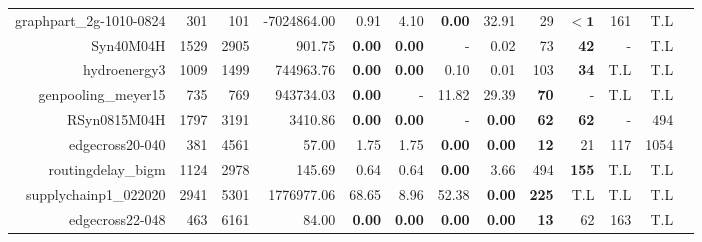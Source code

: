 \begin{landscape}
\begin{table*}[t]
\begin{tabular}{|r|r|r||r||r|r|r|r||r|r|r|r|r|}
             graphpart\_2g-1010-0824 &           301 &           101 &                       -7024864.00 &           0.91 &           4.10 &  \textbf{0.00} &          32.91 &                 29 &         $\bm{< 1}$ &                161 &                T.L \\ 
                           Syn40M04H &          1529 &          2905 &                            901.75 &  \textbf{0.00} &  \textbf{0.00} &              - &           0.02 &                 73 &        \textbf{42} &                  - &                T.L \\ 
                        hydroenergy3 &          1009 &          1499 &                         744963.76 &  \textbf{0.00} &  \textbf{0.00} &           0.10 &           0.01 &                103 &        \textbf{34} &                T.L &                T.L \\ 
                 genpooling\_meyer15 &           735 &           769 &                         943734.03 &  \textbf{0.00} &              - &          11.82 &          29.39 &        \textbf{70} &                  - &                T.L &                T.L \\ 
                        RSyn0815M04H &          1797 &          3191 &                           3410.86 &  \textbf{0.00} &  \textbf{0.00} &              - &  \textbf{0.00} &        \textbf{62} &        \textbf{62} &                  - &                494 \\ 
                     edgecross20-040 &           381 &          4561 &                             57.00 &           1.75 &           1.75 &  \textbf{0.00} &  \textbf{0.00} &        \textbf{12} &                 21 &                117 &               1054 \\ 
                  routingdelay\_bigm &          1124 &          2978 &                            145.69 &           0.64 &           0.64 &  \textbf{0.00} &           3.66 &                494 &       \textbf{155} &                T.L &                T.L \\ 
               supplychainp1\_022020 &          2941 &          5301 &                        1776977.06 &          68.65 &           8.96 &          52.38 &  \textbf{0.00} &       \textbf{225} &                T.L &                T.L &                T.L \\ 
                     edgecross22-048 &           463 &          6161 &                             84.00 &  \textbf{0.00} &  \textbf{0.00} &  \textbf{0.00} &  \textbf{0.00} &        \textbf{13} &                 62 &                163 &                T.L \\ 

\end{tabular}
\end{table*}
\end{landscape}

